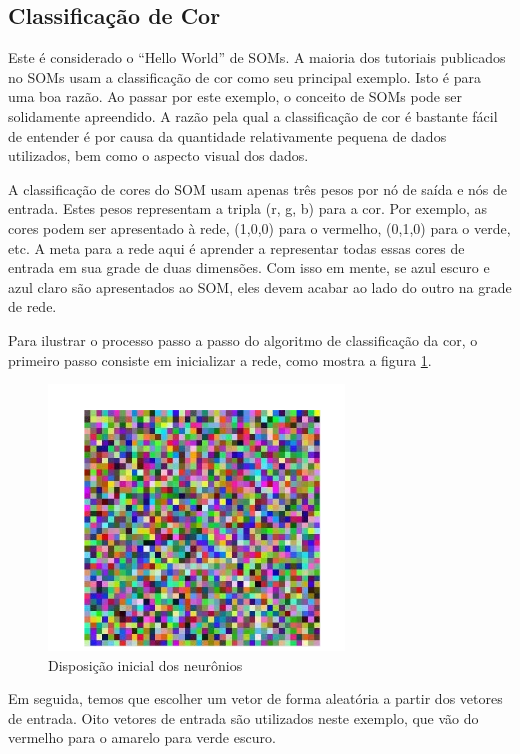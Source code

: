 \subsection{Classificação de Cor}
Este é considerado o ``Hello World'' de SOMs. A maioria dos tutoriais publicados no
SOMs usam a classificação de cor como seu principal exemplo. Isto é para uma boa razão. Ao passar por este exemplo, o conceito de SOMs pode ser solidamente apreendido. A razão pela qual a classificação de cor é bastante fácil de entender é por causa da quantidade relativamente pequena de dados utilizados, bem como o aspecto visual dos dados.

A classificação de cores do SOM usam apenas três pesos por nó de saída e nós de entrada. Estes pesos representam a tripla (r, g, b) para a cor. Por exemplo, as cores podem ser apresentado à rede, (1,0,0) para o vermelho, (0,1,0) para o verde, etc. A meta para a rede aqui é aprender a representar todas essas cores de entrada em sua grade de duas dimensões. Com isso em mente, se azul escuro e azul claro são apresentados ao SOM, eles devem acabar ao lado do outro na grade de rede.

Para ilustrar o processo passo a passo do algoritmo de classificação da cor, o primeiro passo consiste em inicializar a rede, como mostra a figura \ref{fig:initial-node}.

\begin{figure}[ht]
\centering
\includegraphics[width=0.7\textwidth]{imgs/initial-node.png}
\caption{Disposição inicial dos neurônios}
\label{fig:initial-node}
\end{figure}


Em seguida, temos que escolher um vetor de forma aleatória a partir dos vetores de entrada. Oito vetores de entrada são utilizados neste exemplo, que vão do vermelho para o amarelo para verde escuro. 

